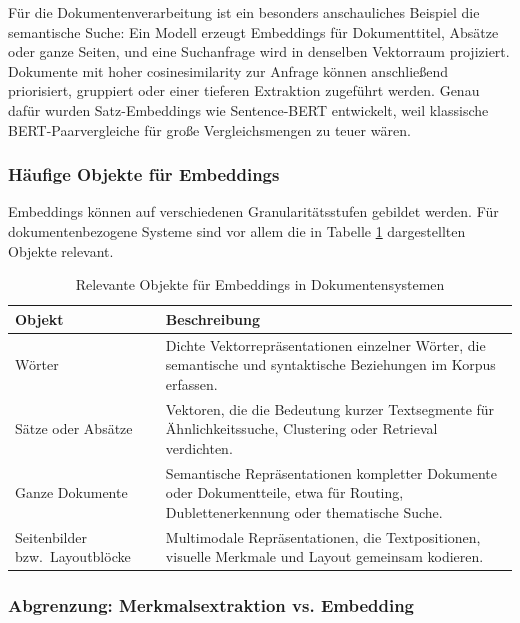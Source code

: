 Für die Dokumentenverarbeitung ist ein besonders anschauliches Beispiel die semantische Suche: Ein Modell erzeugt Embeddings für Dokumenttitel, Absätze oder ganze Seiten, und eine Suchanfrage wird in denselben Vektorraum projiziert. Dokumente mit hoher \gls{cosinesimilarity} zur Anfrage können anschließend priorisiert, gruppiert oder einer tieferen Extraktion zugeführt werden. Genau dafür wurden Satz-Embeddings wie Sentence-BERT entwickelt, weil klassische BERT-Paarvergleiche für große Vergleichsmengen zu teuer wären. \cite{sentence_bert_2019,sbert_sts_docs}

\subsubsection{Häufige Objekte für Embeddings}

Embeddings können auf verschiedenen Granularitätsstufen gebildet werden. Für dokumentenbezogene Systeme sind vor allem die in Tabelle \ref{tab:Objekte} dargestellten Objekte relevant.

\begin{table}[h]
\centering
\caption{Relevante Objekte für Embeddings in Dokumentensystemen \cite{mikolov2013word2vec,sentence_bert_2019,layoutlm_2020}}
\label{tab:Objekte}
\begin{tabular}{p{4cm} p{10cm}}
\textbf{Objekt} & \textbf{Beschreibung} \\ \hline

Wörter &
Dichte Vektorrepräsentationen einzelner Wörter, die semantische und syntaktische Beziehungen im Korpus erfassen. \\\hline

Sätze oder Absätze &
Vektoren, die die Bedeutung kurzer Textsegmente für Ähnlichkeitssuche, Clustering oder Retrieval verdichten.  \\\hline

Ganze Dokumente &
Semantische Repräsentationen kompletter Dokumente oder Dokumentteile, etwa für Routing, Dublettenerkennung oder thematische Suche. \\ \hline

Seitenbilder bzw.\ Layoutblöcke &
Multimodale Repräsentationen, die Textpositionen, visuelle Merkmale und Layout gemeinsam kodieren. \\ \hline

\end{tabular}
\end{table}

\subsubsection{Abgrenzung: Merkmalsextraktion vs. Embedding}


